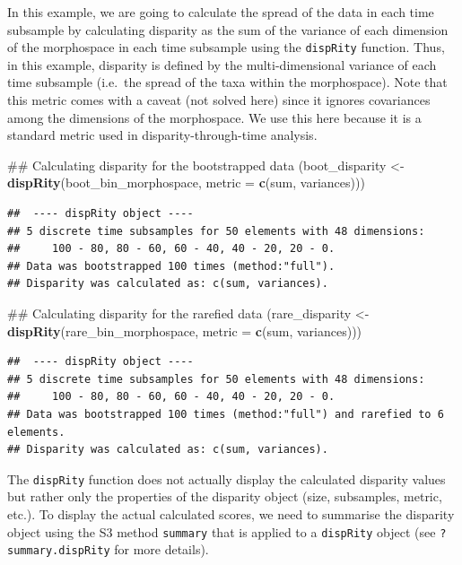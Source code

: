 \documentclass[]{book}
\newenvironment{Shaded}{\begin{snugshade}}{\end{snugshade}}
\newcommand{\KeywordTok}[1]{\textcolor[rgb]{0.13,0.29,0.53}{\textbf{#1}}}
\newcommand{\DataTypeTok}[1]{\textcolor[rgb]{0.13,0.29,0.53}{#1}}
\newcommand{\StringTok}[1]{\textcolor[rgb]{0.31,0.60,0.02}{#1}}
\newcommand{\NormalTok}[1]{#1}
\theoremstyle{definition}
\theoremstyle{definition}
\theoremstyle{remark}
\begin{document}
In this example, we are going to calculate the spread of the data in
each time subsample by calculating disparity as the sum of the variance
of each dimension of the morphospace in each time subsample using the
\texttt{dispRity} function. Thus, in this example, disparity is defined
by the multi-dimensional variance of each time subsample (i.e.~the
spread of the taxa within the morphospace). Note that this metric comes
with a caveat (not solved here) since it ignores covariances among the
dimensions of the morphospace. We use this here because it is a standard
metric used in disparity-through-time analysis.

\begin{Shaded}
\begin{Highlighting}[]
\NormalTok{## Calculating disparity for the bootstrapped data}
\NormalTok{(boot_disparity <-}\StringTok{ }\KeywordTok{dispRity}\NormalTok{(boot_bin_morphospace, }\DataTypeTok{metric =} \KeywordTok{c}\NormalTok{(sum, variances)))}
\end{Highlighting}
\end{Shaded}

\begin{verbatim}
##  ---- dispRity object ---- 
## 5 discrete time subsamples for 50 elements with 48 dimensions:
##     100 - 80, 80 - 60, 60 - 40, 40 - 20, 20 - 0.
## Data was bootstrapped 100 times (method:"full").
## Disparity was calculated as: c(sum, variances).
\end{verbatim}

\begin{Shaded}
\begin{Highlighting}[]
\NormalTok{## Calculating disparity for the rarefied data}
\NormalTok{(rare_disparity <-}\StringTok{ }\KeywordTok{dispRity}\NormalTok{(rare_bin_morphospace, }\DataTypeTok{metric =} \KeywordTok{c}\NormalTok{(sum, variances)))}
\end{Highlighting}
\end{Shaded}

\begin{verbatim}
##  ---- dispRity object ---- 
## 5 discrete time subsamples for 50 elements with 48 dimensions:
##     100 - 80, 80 - 60, 60 - 40, 40 - 20, 20 - 0.
## Data was bootstrapped 100 times (method:"full") and rarefied to 6 elements.
## Disparity was calculated as: c(sum, variances).
\end{verbatim}

The \texttt{dispRity} function does not actually display the calculated
disparity values but rather only the properties of the disparity object
(size, subsamples, metric, etc.). To display the actual calculated
scores, we need to summarise the disparity object using the S3 method
\texttt{summary} that is applied to a \texttt{dispRity} object (see
\texttt{?summary.dispRity} for more details).
\end{document}
